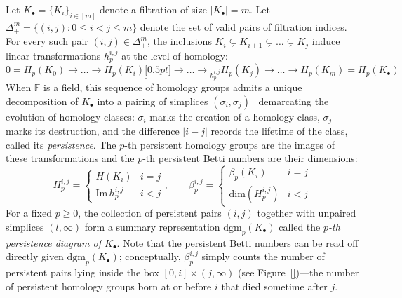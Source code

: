 \documentclass[10pt]{article}
\newcommand{\+}{%
	\raisebox{0.18ex}{\scaleobj{0.55}{+}}
}
\begin{document}
Let $K_\bullet = \{K_i\}_{i\in [m]}$ denote a filtration of size $\lvert K_\bullet \rvert = m$. 
Let $\Delta_{+}^m = \{ (i,j) : 0 \leq i < j \leq m \}$ denote the set of valid pairs of filtration indices. 
For every such pair $(i,j) \in \Delta_{+}^m$, the inclusions $K_i \subsetneq K_{i+1} \subsetneq \dots \subsetneq K_j$ induce linear transformations $h_p^{i,j}$  at the level of homology:
\begin{equation}\label{eq:hom_map}
	0 = H_p(K_0) \to \dots \to H_p(K_i) \underbracket[0.5pt]{\to \dots \to}_{h_p^{i,j}} H_p(K_j) \to \dots \to H_p(K_m) = H_p(K_\bullet) 
\end{equation}
When $\mathbb{F}$ is a field, this sequence of homology groups admits a unique decomposition of $K_\bullet$ into a pairing of simplices $(\sigma_i, \sigma_j)$~\cite{} demarcating the evolution of homology classes: $\sigma_i$ marks the creation of a homology class, $\sigma_j$ marks its destruction, and the difference $\lvert i - j \rvert$ records the lifetime of the class, called its \emph{persistence}.
The $p$-th persistent homology groups are the images of these transformations and the $p$-th persistent Betti numbers are their dimensions:
\begin{equation}
	H_{p}^{i,j} = \begin{cases}
	H(K_i) & i = j \\ 
 	\mathrm{Im}\,h_p^{i,j} & i < j
 \end{cases}
, \quad \quad 
\beta_p^{i,j} = \begin{cases}
 	\beta_p(K_i) & i = j \\
 	\mathrm{dim}(H_{p}^{i,j}) & i < j
 \end{cases}
\end{equation}
For a fixed $p \geq 0$, the collection of persistent pairs $(i, j)$ together with unpaired simplices $(l, \infty)$ form a summary representation $\mathrm{dgm}_p(K_\bullet)$ called the \emph{$p$-th persistence diagram of $K_\bullet$}. Note that the persistent Betti numbers can be read off directly given $\mathrm{dgm}_p(K_\bullet)$; conceptually, $\beta_p^{i,j}$ simply counts the number of persistent pairs lying inside the box $[0, i] \times (j, \infty)$ (see Figure~\ref{})---the number of persistent homology groups born at or before $i$ that died sometime after $j$. 
\\
\\
\end{document}
